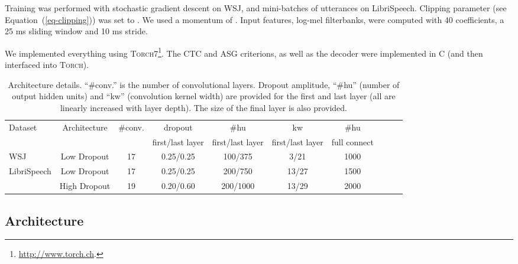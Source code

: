 \documentclass{article}
\begin{document}
Training was performed with stochastic gradient descent on WSJ, and
mini-batches of  utterances on LibriSpeech. Clipping parameter (see
Equation~(\ref{eq-clipping})) was set to . We used a momentum
of . Input features, log-mel filterbanks, were computed with 40 coefficients,
a 25 ms sliding window and 10 ms stride.

We implemented everything using \textsc{\small
  Torch7}\footnote{\url{http://www.torch.ch}.}.
The CTC and ASG criterions, as well as the decoder were implemented in C
(and then interfaced into \textsc{\small Torch}).





\begin{table*}
\begin{center}
  \caption{
    Architecture details. ``\#conv.'' is the number of convolutional
    layers. Dropout amplitude, ``\#hu'' (number of output hidden units) and
    ``kw'' (convolution kernel width) are provided for the first and last
    layer (all are linearly increased with layer depth). The size of the final
    layer is also provided.}
    \label{tbl-arch}
      \small
      \setlength{\tabcolsep}{4.0pt}
      \begin{tabular}{lccccccccc}
        \toprule
        Dataset & Architecture & \#conv. & dropout & \#hu & kw & \#hu \\
        & & & {\footnotesize first/last layer} & {\footnotesize first/last layer} & {\footnotesize first/last layer} & {\footnotesize full connect} \\
        \midrule
        WSJ & Low Dropout  & 17 & 0.25/0.25 & 100/375  & 3/21 & 1000 \\
        \midrule
        LibriSpeech & Low Dropout  & 17 & 0.25/0.25 & 200/750  & 13/27 & 1500 \\
                    & High Dropout & 19 & 0.20/0.60 & 200/1000 & 13/29 & 2000 \\
        \bottomrule
      \end{tabular}
\end{center}
\end{table*}

\subsection{Architecture}
\label{sec-experiments-arch}
\end{document}
